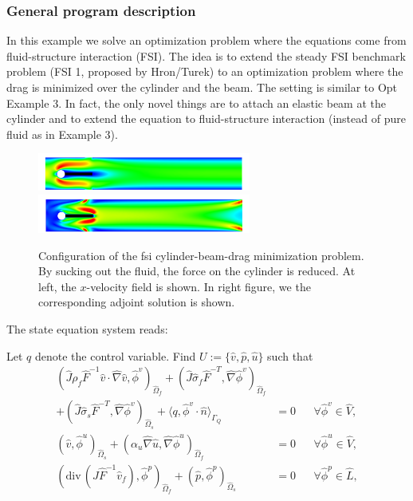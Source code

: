 \subsubsection{General program description}
In this example we solve an optimization problem where 
the equations come from fluid-structure interaction (FSI). The idea
is to extend the steady FSI benchmark problem (FSI 1, proposed by Hron/Turek) 
to an optimization 
problem where the drag is minimized over the cylinder and the beam. 
The setting is similar to Opt Example 3. In fact, the only 
novel things are to attach an elastic beam at the cylinder and to 
extend the equation to fluid-structure interaction (instead of 
pure fluid as in Example 3).

\begin{figure}[h]
\centering
    {\includegraphics[width=7cm]{Documentation/visit_fsi_1_opt_control_p3_0002_bearbeitet_Aug_15.png}}
    {\includegraphics[width=7cm]{Documentation/visit_fsi_1_opt_control_p3_0005_bearbeitet_Aug_15.png}}
  \caption{Configuration of the fsi cylinder-beam-drag minimization problem. 
By sucking out the fluid, 
the force on the cylinder is reduced. At left, the $x$-velocity field 
is shown. In right figure, we the corresponding adjoint solution is shown.}
  \label{ex_2_plots}
\end{figure}

The state equation system reads:
\begin{Problem}
Let $q$ denote the control variable. Find $U:= \{\hat v,\hat p,\hat u\}$ such that
  \begin{equation*}
    \begin{aligned}
      (\hat J \rho_f \hat F^{-1}\hat  v\cdot\hat\nabla \hat v,
      \hat\phi^v)_{\hat\Omega_f}
      + (\hat J\hat\sigma_f\hat F^{-T},\hat \nabla\hat\phi^v)_{\hat\Omega_f}\\
      + (\hat J\hat\sigma_s\hat F^{-T},\hat \nabla\hat\phi^v)_{\hat\Omega_s}
      + \langle q,\hat\phi^v\cdot \hat n\rangle_{\Gamma_Q}
      &= 0&&\forall\hat\phi^v\in \hat V,\\
      (\hat v,\hat\phi^u)_{\hat\Omega_s}
      + (\alpha_u \hat \nabla \hat u,\hat \nabla\hat\phi^u)_{\hat\Omega_f}
      &=0&&\forall\hat\phi^u\in \hat V,\\
      (\widehat{\text{div}}\,(\hat J\hat F^{-1}\hat
      v_f),\hat\phi^p)_{\hat\Omega_f} 
      + (\hat p,\hat \phi^p)_{\hat\Omega_s}
      &=0&&\forall\hat \phi^p\in \hat L,
    \end{aligned}
  \end{equation*}  
\end{Problem}

